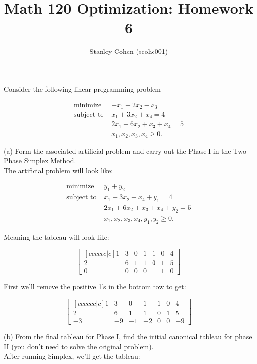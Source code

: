 \documentclass[12pt]{extarticle}
\title{Math 120 Optimization: Homework 6}
\author{Stanley Cohen (scohe001)}
\date{}
\theoremstyle{definition}
\begin{document}
\maketitle

\begin{problem} Consider the following linear programming problem

  	\begin{align*}
	\text{minimize } &-x_1+2x_2-x_3\\
	\text{subject to } & x_1+3x_2+x_4=4\\
	&2x_1+6x_2+x_3+x_4=5\\
	&x_1,x_2,x_3,x_4\geq 0.
	\end{align*}

	\begin{description}
		\item{(a)} Form the associated artificial problem and carry out the Phase I in the Two-Phase Simplex Method.\\

		The artificial problem will look like:

		\begin{align*}
		\text{minimize } &y_1 + y_2\\
		\text{subject to } & x_1+3x_2+x_4+y_1=4\\
		&2x_1+6x_2+x_3+x_4+y_2=5\\
		&x_1,x_2,x_3,x_4,y_1,y_2\geq 0.
		\end{align*}

		Meaning the tableau will look like:

		$$\begin{bmatrix}[cccccc|c] 1&3&0&1&1&0&4\\ 2&6&1&1&0&1&5 \\ 0&0&0&0&1&1&0 \end{bmatrix}$$

		First we'll remove the positive 1's in the bottom row to get:

		$$\begin{bmatrix}[cccccc|c] 1&3&0&1&1&0&4\\ 2&6&1&1&0&1&5 \\ -3&-9&-1&-2&0&0&-9 \end{bmatrix}$$

		\item{(b)} From the final tableau for Phase I, find the initial canonical tableau for phase II (you don't need to solve the original problem).\\

		After running Simplex, we'll get the tableau:


\end{description}
\end{problem}
\end{document}
